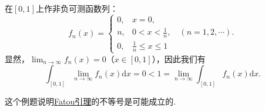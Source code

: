 \documentclass[../../main.tex]{subfiles}%
\begin{document}
\begin{example}\label{example:Fatou引理不等号成立的例子}
在\([0, 1]\)上作非负可测函数列：
\[
f_n(x)=
\begin{cases}
0, & x = 0, \\
n, & 0 < x < \frac{1}{n}, \quad (n = 1, 2, \cdots). \\
0, & \frac{1}{n} \leqslant x \leqslant 1
\end{cases}
\]
显然，\(\lim_{n \to \infty} f_n(x) = 0\)（\(x \in [0, 1]\)），因此我们有
\[
\int_{[0, 1]} \lim_{n \to \infty} f_n(x) \mathrm{d}x = 0 < 1 = \lim_{n \to \infty} \int_{[0, 1]} f_n(x) \mathrm{d}x.
\] 
\end{example}
\begin{note}
这个例题说明\hyperref[theorem:Fatou引理]{Fatou引理}的不等号是可能成立的.
\end{note}
\end{document}
